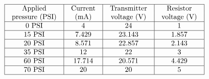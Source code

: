 
$$\vbox{\offinterlineskip
\halign{\strut
\vrule \quad\hfil # \ \hfil & 
\vrule \quad\hfil # \ \hfil & 
\vrule \quad\hfil # \ \hfil & 
\vrule \quad\hfil # \ \hfil \vrule \cr
\noalign{\hrule}
%
Applied & Current & Transmitter & Resistor \cr
%
pressure (PSI) & (mA) & voltage (V) & voltage (V) \cr
%
\noalign{\hrule}
%
0 PSI & 4 & 24 & 1 \cr
%
\noalign{\hrule}
%
15 PSI & 7.429 & 23.143 & 1.857 \cr
%
\noalign{\hrule}
%
20 PSI & 8.571 & 22.857 & 2.143 \cr
%
\noalign{\hrule}
%
35 PSI & 12 & 22 & 3 \cr
%
\noalign{\hrule}
%
60 PSI & 17.714 & 20.571 & 4.429 \cr
%
\noalign{\hrule}
%
70 PSI & 20 & 20 & 5 \cr
%
\noalign{\hrule}
} %
}$$ %




